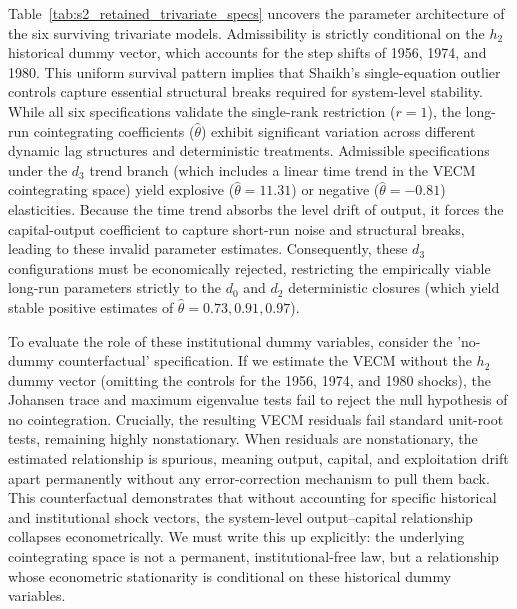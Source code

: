 \documentclass[11pt]{article}
\begin{document}
Table~\ref{tab:s2_retained_trivariate_specs} uncovers the parameter architecture of the six surviving trivariate models. Admissibility is strictly conditional on the $h_2$ historical dummy vector, which accounts for the step shifts of 1956, 1974, and 1980. This uniform survival pattern implies that Shaikh’s single-equation outlier controls capture essential structural breaks required for system-level stability. While all six specifications validate the single-rank restriction ($r=1$), the long-run cointegrating coefficients ($\hat{\theta}$) exhibit significant variation across different dynamic lag structures and deterministic treatments. Admissible specifications under the $d_3$ trend branch (which includes a linear time trend in the VECM cointegrating space) yield explosive ($\hat{\theta} = 11.31$) or negative ($\hat{\theta} = -0.81$) elasticities. Because the time trend absorbs the level drift of output, it forces the capital-output coefficient to capture short-run noise and structural breaks, leading to these invalid parameter estimates. Consequently, these $d_3$ configurations must be economically rejected, restricting the empirically viable long-run parameters strictly to the $d_0$ and $d_2$ deterministic closures (which yield stable positive estimates of $\hat{\theta} = 0.73, 0.91, 0.97$).

To evaluate the role of these institutional dummy variables, consider the 'no-dummy counterfactual' specification. If we estimate the VECM without the $h_2$ dummy vector (omitting the controls for the 1956, 1974, and 1980 shocks), the Johansen trace and maximum eigenvalue tests fail to reject the null hypothesis of no cointegration. Crucially, the resulting VECM residuals fail standard unit-root tests, remaining highly nonstationary. When residuals are nonstationary, the estimated relationship is spurious, meaning output, capital, and exploitation drift apart permanently without any error-correction mechanism to pull them back. This counterfactual demonstrates that without accounting for specific historical and institutional shock vectors, the system-level output--capital relationship collapses econometrically. We must write this up explicitly: the underlying cointegrating space is not a permanent, institutional-free law, but a relationship whose econometric stationarity is conditional on these historical dummy variables.
\end{document}
